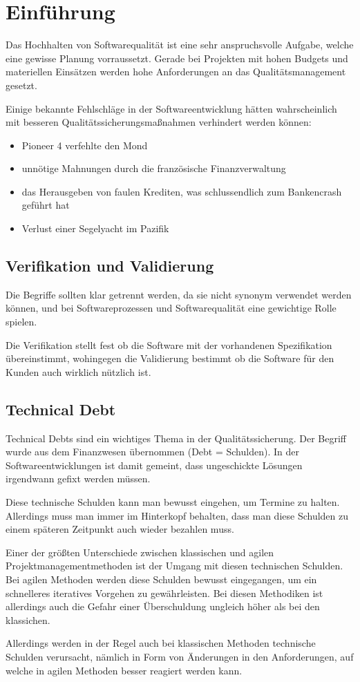 \chapter{Einführung}
Das Hochhalten von Softwarequalität ist eine sehr anspruchsvolle Aufgabe, welche eine gewisse Planung vorraussetzt. Gerade bei Projekten mit hohen Budgets und materiellen Einsätzen werden hohe Anforderungen an das Qualitätsmanagement gesetzt.

Einige bekannte Fehlschläge in der Softwareentwicklung hätten wahrscheinlich mit besseren Qualitätssicherungsmaßnahmen verhindert werden können:

\begin{itemize}
    \item Pioneer 4 verfehlte den Mond
    \item unnötige Mahnungen durch die französische Finanzverwaltung
    \item das Herausgeben von faulen Krediten, was schlussendlich zum Bankencrash geführt hat
    \item Verlust einer Segelyacht im Pazifik
\end{itemize}

\section{Verifikation und Validierung}
Die Begriffe sollten klar getrennt werden, da sie nicht synonym verwendet werden können, und bei Softwareprozessen und Softwarequalität eine gewichtige Rolle spielen.

Die Verifikation stellt fest ob die Software mit der vorhandenen Spezifikation übereinstimmt, wohingegen die Validierung bestimmt ob die Software für den Kunden auch wirklich nützlich ist.

\section{Technical Debt}
Technical Debts sind ein wichtiges Thema in der Qualitätssicherung. Der Begriff wurde aus dem Finanzwesen übernommen (Debt = Schulden). In der Softwareentwicklungen ist damit gemeint, dass ungeschickte Lösungen irgendwann gefixt werden müssen.

Diese technische Schulden kann man bewusst eingehen, um Termine zu halten. Allerdings muss man immer im Hinterkopf behalten, dass man diese Schulden zu einem späteren Zeitpunkt auch wieder bezahlen muss.

Einer der größten Unterschiede zwischen klassischen und agilen Projektmanagementmethoden ist der Umgang mit diesen technischen Schulden. Bei agilen Methoden werden diese Schulden bewusst eingegangen, um ein schnelleres iteratives Vorgehen zu gewährleisten. Bei diesen Methodiken ist allerdings auch die Gefahr einer Überschuldung ungleich höher als bei den klassichen.

Allerdings werden in der Regel auch bei klassischen Methoden technische Schulden verursacht, nämlich in Form von Änderungen in den Anforderungen, auf welche in agilen Methoden besser reagiert werden kann.
